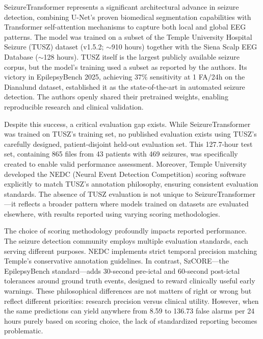 \documentclass[10pt]{article}
\begin{document}
SeizureTransformer represents a significant architectural advance in seizure detection, combining U-Net's proven biomedical segmentation capabilities with Transformer self-attention mechanisms to capture both local and global EEG patterns. The model was trained on a subset of the Temple University Hospital Seizure (TUSZ) dataset (v1.5.2; $\sim$910 hours) together with the Siena Scalp EEG Database ($\sim$128 hours). TUSZ itself is the largest publicly available seizure corpus, but the model's training used a subset as reported by the authors. Its victory in EpilepsyBench 2025, achieving 37\% sensitivity at 1 FA/24h on the Dianalund dataset, established it as the state-of-the-art in automated seizure detection. The authors openly shared their pretrained weights, enabling reproducible research and clinical validation.

Despite this success, a critical evaluation gap exists. While SeizureTransformer was trained on TUSZ's training set, no published evaluation exists using TUSZ's carefully designed, patient-disjoint held-out evaluation set. This 127.7-hour test set, containing 865 files from 43 patients with 469 seizures, was specifically created to enable valid performance assessment. Moreover, Temple University developed the NEDC (Neural Event Detection Competition) scoring software explicitly to match TUSZ's annotation philosophy, ensuring consistent evaluation standards. The absence of TUSZ evaluation is not unique to SeizureTransformer—it reflects a broader pattern where models trained on datasets are evaluated elsewhere, with results reported using varying scoring methodologies.

The choice of scoring methodology profoundly impacts reported performance. The seizure detection community employs multiple evaluation standards, each serving different purposes. NEDC implements strict temporal precision matching Temple's conservative annotation guidelines. In contrast, SzCORE—the EpilepsyBench standard—adds 30-second pre-ictal and 60-second post-ictal tolerances around ground truth events, designed to reward clinically useful early warnings. These philosophical differences are not matters of right or wrong but reflect different priorities: research precision versus clinical utility. However, when the same predictions can yield anywhere from 8.59 to 136.73 false alarms per 24 hours purely based on scoring choice, the lack of standardized reporting becomes problematic.
\end{document}
